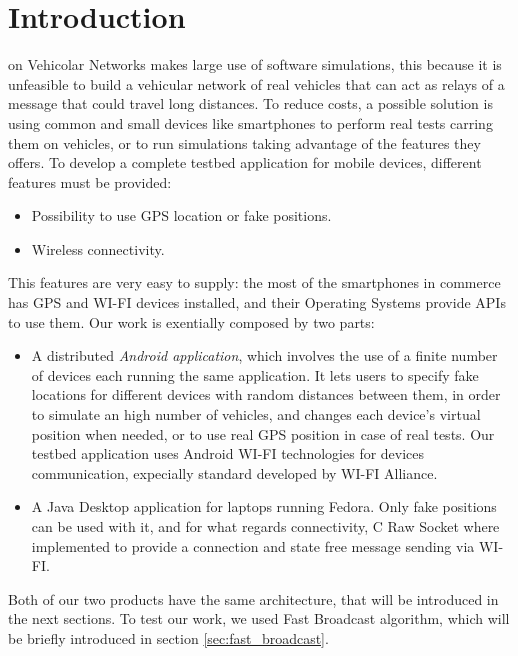 \section{Introduction}
% 
% 
% 
% 
 on Vehicolar Networks makes large use of software simulations, this because it is unfeasible to build a vehicular network of real vehicles that can act as relays of a message that could travel long distances.
To reduce costs, a possible solution is using common and small devices like smartphones to perform real tests carring them on vehicles, or to run simulations taking advantage of the features they offers.
To develop a complete testbed application for mobile devices, different features must be provided:
\begin{itemize}
	\item Possibility to use GPS location or fake positions.
	\item Wireless connectivity.
\end{itemize}

This features are very easy to supply: the most of the smartphones in commerce has GPS and WI-FI devices installed, and their Operating Systems provide APIs to use them.
Our work is exentially composed by two parts:
\begin{itemize}
	\item A distributed \textit{Android application}, which involves the use of a finite number of devices each running the same application. It lets users to specify fake locations for different devices with random distances between them, in order to simulate an high number of vehicles, and changes each device's virtual position when needed, or to use real GPS position in case of real tests. Our testbed application uses Android WI-FI technologies for devices communication, expecially \direct standard developed by WI-FI Alliance\textsuperscript{\texttrademark}.
	\item A Java Desktop application for laptops running Fedora. Only fake positions can be used with it, and for what regards connectivity, C Raw Socket where implemented to provide a connection and state free message sending via WI-FI. 
\end{itemize}

Both of our two products have the same architecture, that will be introduced in the next sections. To test our work, we used Fast Broadcast algorithm, which will be briefly introduced in section \ref{sec:fast_broadcast}.

